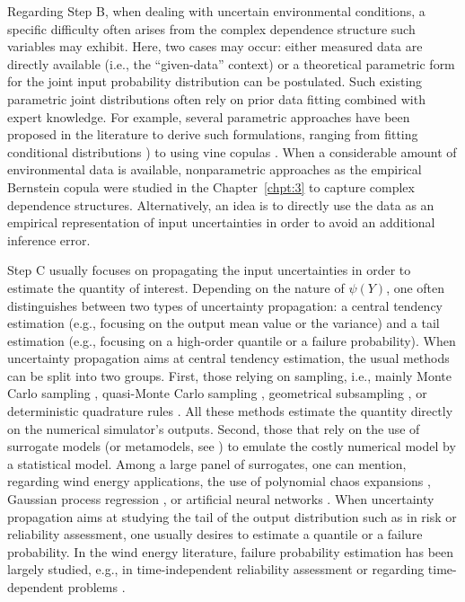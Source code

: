 Regarding Step B, when dealing with uncertain environmental conditions, a specific difficulty 
often arises from the complex dependence structure such variables may exhibit. 
Here, two cases may occur: either measured data are directly available (i.e., the ``given-data'' context) or a theoretical parametric form for the joint input probability distribution can be postulated.
Such existing parametric joint distributions often rely on prior data fitting combined with expert knowledge. 
For example, several parametric approaches have been proposed in the literature to derive such formulations, ranging from fitting conditional distributions \citealp{vanem_fekhari_2023}) to using vine copulas \citep{li_zhan_2020}. 
When a considerable amount of environmental data is available, nonparametric approaches as the empirical Bernstein copula were studied in the Chapter~\ref{chpt:3} to capture complex dependence structures. 
Alternatively, an idea is to directly use the data as an empirical representation of input uncertainties in order to avoid an additional inference error. 

Step C usually focuses on propagating the input uncertainties in order to estimate the quantity of interest. 
Depending on the nature of $\psi(Y)$, one often distinguishes between two types of uncertainty propagation: a central tendency estimation (e.g., focusing on the output mean value or the variance) and a tail estimation (e.g., focusing on a high-order quantile or a failure probability). 
When uncertainty propagation aims at central tendency estimation, the usual methods can be split into two groups. 
First, those relying on sampling, i.e., mainly Monte Carlo sampling \citep{graf_2016}, quasi-Monte Carlo sampling \citep{muller_cheng_2018}, geometrical subsampling \citep{kanner_2018_OMAE}, or deterministic quadrature rules \citep{bos_2020}. 
All these methods estimate the quantity directly on the numerical simulator's outputs. 
Second, those that rely on the use of surrogate models (or metamodels, see ) to emulate the costly numerical model by a statistical model. 
Among a large panel of surrogates, one can mention, regarding wind energy applications, the use of polynomial chaos expansions \citep{dimitrov_kelly_2018, murcia_dimitrov_2018}, Gaussian process regression \citep{huchet_2019,teixeira_gp_2019,slot_sorensen_2020,wilkie_galasso_2021}, or artificial neural networks \citep{aoues_2023}. 
When uncertainty propagation aims at studying the tail of the output distribution such as in risk or reliability assessment, one usually desires to estimate a quantile or a failure probability. 
In the wind energy literature, failure probability estimation has been largely studied, e.g., in time-independent reliability assessment \citep{zwick_muskulus_2015,slot_sorensen_2020,wilkie_galasso_2021} or regarding time-dependent problems \citep{abdallah_lataniotis_2019,lataniotis_2019}.

